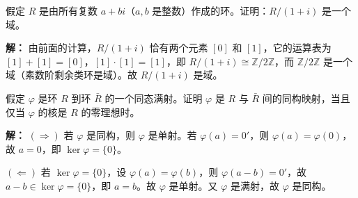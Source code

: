 \begin{example}[$R/(1+i)$ 是域]
假定 $R$ 是由所有复数 $a+bi$（$a,b$ 是整数）作成的环。证明：$R/(1+i)$ 是一个域。

\textbf{解：} 由前面的计算，$R/(1+i)$ 恰有两个元素 $[0]$ 和 $[1]$，它的运算表为 $[1]+[1]=[0]$，$[1]\cdot[1]=[1]$，即 $R/(1+i)\cong\mathbb{Z}/2\mathbb{Z}$，而 $\mathbb{Z}/2\mathbb{Z}$ 是一个域（素数阶剩余类环是域）。故 $R/(1+i)$ 是域。
\end{example}

\begin{example}
假定 $\varphi$ 是环 $R$ 到环 $\bar{R}$ 的一个同态满射。证明 $\varphi$ 是 $R$ 与 $\bar{R}$ 间的同构映射，当且仅当 $\varphi$ 的核是 $R$ 的零理想时。

\textbf{解：} $(\Rightarrow)$ 若 $\varphi$ 是同构，则 $\varphi$ 是单射。若 $\varphi(a)=0'$，则 $\varphi(a)=\varphi(0)$，故 $a=0$，即 $\ker\varphi=\{0\}$。

$(\Leftarrow)$ 若 $\ker\varphi=\{0\}$，设 $\varphi(a)=\varphi(b)$，则 $\varphi(a-b)=0'$，故 $a-b\in\ker\varphi=\{0\}$，即 $a=b$。故 $\varphi$ 是单射。又 $\varphi$ 是满射，故 $\varphi$ 是同构。
\end{example}
